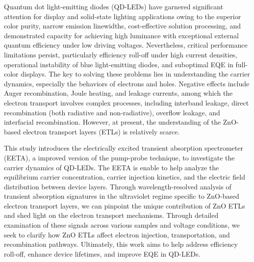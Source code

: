 \begin{abstract*}
  Quantum dot light-emitting diodes (QD-LEDs) have garnered significant attention for display and solid-state lighting applications owing to the superior color purity, narrow emission linewidths, cost-effective solution processing, and demonstrated capacity for achieving high luminance with exceptional external quantum efficiency under low driving voltages. Nevertheless, critical performance limitations persist, particularly efficiency roll-off under high current densities, operational instability of blue light-emitting diodes, and suboptimal EQE in full-color displays. The key to solving these problems lies in understanding the carrier dynamics, especially the behaviors of electrons and holes. Negative effects include Auger recombination, Joule heating, and leakage currents, among which the electron transport involves complex processes, including interband leakage, direct recombination (both radiative and non-radiative), overflow leakage, and interfacial recombination. However, at present, the understanding of the ZnO-based electron transport layers (ETLs) is relatively scarce.
  
  This study introduces the electrically excited transient absorption spectrometer (EETA), a improved version of the pump-probe technique, to investigate the carrier dynamics of QD-LEDs. The EETA is enable to help analyze the equilibrium carrier concentration, carrier injection kinetics, and the electric field distribution between device layers. Through wavelength-resolved analysis of transient absorption signatures in the ultraviolet regime specific to ZnO-based electron transport layers,
  we can pinpoint the unique contribution of ZnO ETLs and shed light on the electron transport mechanisms. Through detailed examination of these signals across various samples and voltage conditions, we seek to clarify how ZnO ETLs affect electron injection, transportation, and recombination pathways. Ultimately, this work aims to help address efficiency roll-off, enhance device lifetimes, and improve EQE in QD-LEDs.
\end{abstract*}
